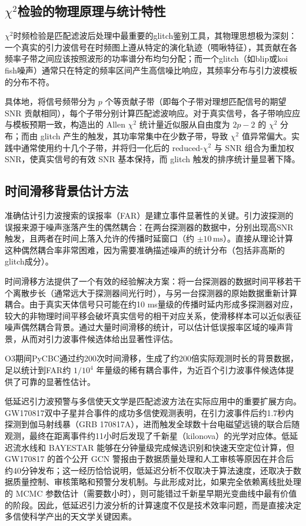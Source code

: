 \subsection{$\chi^2$检验的物理原理与统计特性}

$\chi^2$时频检验是匹配滤波后处理中最重要的glitch鉴别工具，其物理思想极为深刻：一个真实的引力波信号在时频图上遵从特定的演化轨迹（啁啾特征），其贡献在各频率子带之间应该按照波形的功率谱分布均匀分配；而一个glitch（如blip或koi fish噪声）通常只在特定的频率区间产生高信噪比响应，其频率分布与引力波模板的分布不符。

具体地，将信号频带分为 $p$ 个等贡献子带（即每个子带对理想匹配信号的期望 SNR 贡献相同），每个子带分别计算匹配滤波响应。对于真实信号，各子带响应应与模板预期一致，构造出的 Allen $\chi^2$ 统计量近似服从自由度为 $2p-2$ 的 $\chi^2$ 分布；而由 glitch 产生的触发，其功率常集中在少数子带，导致 $\chi^2$ 值异常偏大。实践中通常使用约十几个子带，并将归一化后的 reduced-$\chi^2$ 与 SNR 组合为重加权 SNR，使真实信号的有效 SNR 基本保持，而 glitch 触发的排序统计量显著下降。

\subsection{时间滑移背景估计方法}

准确估计引力波搜索的误报率（FAR）是建立事件显著性的关键。引力波探测的误报来源于噪声涨落产生的偶然耦合：在两台探测器的数据中，分别出现高SNR触发，且两者在时间上落入允许的传播时延窗口（约 $\pm 10\,\mathrm{ms}$）。直接从理论计算这种偶然耦合率非常困难，因为需要准确描述噪声的统计分布（包括非高斯的glitch成分）。

时间滑移方法提供了一个有效的经验解决方案：将一台探测器的数据时间平移若干个离散步长（通常远大于探测器间光行时），与另一台探测器的原始数据重新计算耦合。由于真实天体信号只可能在约10 ms量级的传播时延内形成多探测器对应，较大的非物理时间平移会破坏真实信号的相干对应关系，使滑移样本可以近似表征噪声偶然耦合背景。通过大量时间滑移的统计，可以估计低误报率区域的噪声背景，从而对引力波事件候选体给出显著性评估。

O3期间PyCBC通过约200次时间滑移，生成了约200倍实际观测时长的背景数据，足以统计到FAR约 $1/10^4$ 年量级的稀有耦合事件，为近百个引力波事件候选体提供了可靠的显著性估计。

低延迟引力波预警与多信使天文学是匹配滤波方法在实际应用中的重要扩展方向。GW170817双中子星并合事件的成功多信使观测表明，在引力波事件后约1.7秒内探测到伽马射线暴（GRB 170817A），进而触发全球数十台电磁望远镜的联合后随观测，最终在距离事件约11小时后发现了千新星（kilonova）的光学对应体。低延迟流水线和 BAYESTAR 能够在分钟量级完成候选识别和快速天空定位计算，但 GW170817 的首个公开 GCN 警报由于数据质量处理和人工审核等原因在并合后约40分钟发布；这一经历恰恰说明，低延迟分析不仅取决于算法速度，还取决于数据质量控制、审核策略和预警分发机制。与此形成对比，如果完全依赖离线批处理的 MCMC 参数估计（需要数小时），则可能错过千新星早期光变曲线中最有价值的阶段。因此，低延迟引力波分析的计算速度不仅是技术效率问题，而是直接决定多信使科学产出的天文学关键因素。

